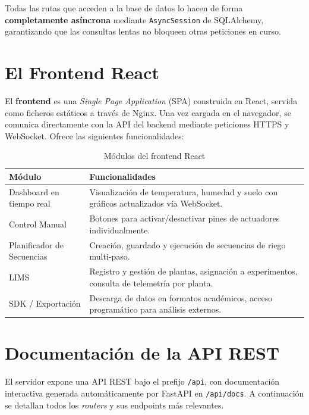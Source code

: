 Todas las rutas que acceden a la base de datos lo hacen de forma \textbf{completamente asíncrona} 
mediante \texttt{AsyncSession} de SQLAlchemy, garantizando que las consultas lentas no 
bloqueen otras peticiones en curso.


\section{El Frontend React}

El \textbf{frontend} es una \textit{Single Page Application} (SPA) construida en React,
servida como ficheros estáticos a través de Nginx. Una vez cargada en el navegador, 
se comunica directamente con la API del backend mediante peticiones HTTPS y WebSocket. 
Ofrece las siguientes funcionalidades:

\begin{table}[H]
    \centering
    \caption{Módulos del frontend React}
    \begin{tabular}{lp{9.5cm}}
        \toprule
        \textbf{Módulo}          & \textbf{Funcionalidades} \\
        \midrule
        Dashboard en tiempo real & Visualización de temperatura, humedad y suelo con gráficos actualizados vía WebSocket. \\
        Control Manual           & Botones para activar/desactivar pines de actuadores individualmente. \\
        Planificador de Secuencias & Creación, guardado y ejecución de secuencias de riego multi-paso. \\
        LIMS                     & Registro y gestión de plantas, asignación a experimentos, consulta de telemetría por planta. \\
        SDK / Exportación        & Descarga de datos en formatos académicos, acceso programático para análisis externos. \\
        \bottomrule
    \end{tabular}
\end{table}


\section{Documentación de la API REST}

El servidor expone una API REST bajo el prefijo \texttt{/api}, con documentación interactiva 
generada automáticamente por FastAPI en \texttt{/api/docs}. A continuación se detallan todos 
los \textit{routers} y sus endpoints más relevantes.

